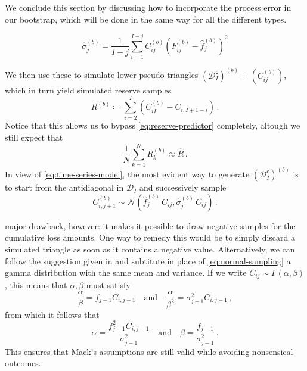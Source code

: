 \documentclass[a4paper]{book}
\begin{document}
We conclude this section by discussing how to incorporate the process error in our bootstrap, which will be done in the same way for all the different types.

\begin{equation}
    \widehat{\sigma}^{(b)}_j = \frac{1}{I-j}\sum_{i = 1}^{I-j} C^{(b)}_{ij}\left( F^{(b)}_{ij} - \widehat{f}^{(b)}_j \right)^2
\end{equation}

We then use these to simulate lower pseudo-triangles $(\mathcal{D}^{\mathsf{c}}_I)^{(b)} = (C^{(b)}_{ij})$, which in turn yield simulated reserve samples
\begin{equation}
    R^{(b)} \coloneqq \sum_{i = 2}^I (C^{(b)}_{iI} - C_{i, I + 1 - i}) \,.
\end{equation}
Notice that this allows us to bypass \eqref{eq:reserve-predictor} completely, altough we still expect that
\begin{equation}
    \frac{1}{N} \sum_{k = 1}^N R^{(b)}_k \approx \widehat{R} \,.
\end{equation}
In view of \eqref{eq:time-series-model}, the most evident way to generate $(\mathcal{D}^{\mathsf{c}}_I)^{(b)}$ is to start from the antidiagonal in $\mathcal{D}_I$ and successively sample
\begin{equation} \label{eq:normal-sampling}
    C^{(b)}_{i, j + 1} \sim \mathcal{N}(\widehat{f}^{(b)}_j \, C_{ij}, \widehat{\sigma}^{(b)}_j \, C_{ij}) \,.
\end{equation}

major drawback, however: it makes it possible to draw negative samples for the cumulative loss amounts. One way to remedy this would be to simply discard a simulated triangle as soon as it contains a negative value. Alternatively, we can follow the suggestion given in \cite[238]{england:dist} and subtitute in place of \eqref{eq:normal-sampling} a gamma distribution with the same mean and variance. If we write $C_{ij} \sim \Gamma(\alpha, \beta)$, this means that $\alpha, \beta$ must satisfy
\begin{equation}
\frac{\alpha}{\beta} = f_{j-1} C_{i, j-1} \quad \text{and} \quad \frac{\alpha}{\beta^2} = \sigma^2_{j-1} C_{i, j-1} \,,
\end{equation}
from which it follows that
\begin{equation}
\alpha = \frac{f_{j-1}^2 C_{i, j-1}}{\sigma_{j-1}^2} \quad \text{and} \quad \beta = \frac{f_{j-1}}{\sigma_{j-1}^2} \,.
\end{equation}
This ensures that Mack's assumptions are still valid while avoiding nonsensical outcomes.
\end{document}
